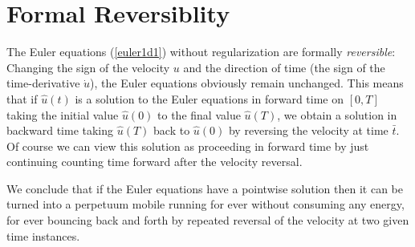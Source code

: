 





 
\section{Formal Reversiblity}

The Euler equations (\ref{euler1d1}) without regularization
are formally \emph{reversible}:
Changing the sign of the velocity $u$ and the direction of time (the
sign of the time-derivative $\dot u$), the Euler equations obviously
remain unchanged. This means that if $\hat u(t)$ is a solution to the
Euler equations in forward time 
on $[0,T]$ taking the initial value $\hat u(0)$ to 
the final value $\hat u(T)$, we
obtain a solution in backward time taking $\hat u(T)$ back to
$\hat u(0)$ by reversing the velocity at time $\bar t$. Of course
we can view this solution as proceeding in forward time by just
continuing counting time forward after the velocity reversal.

We conclude that if the Euler equations 
have a pointwise solution then it can be 
turned into a perpetuum mobile running for ever without 
consuming any energy, for ever bouncing
back and forth by repeated reversal of the velocity at two given
time instances.

